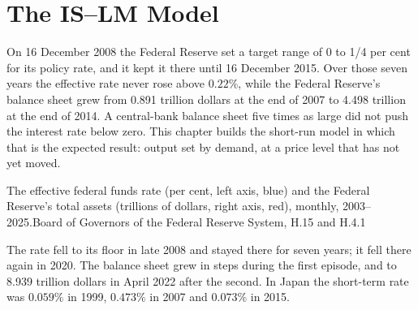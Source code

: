 \chapter{The IS--LM Model}\label{ch:b1:is-lm}

On 16 December 2008 the Federal Reserve set a target range of 0 to 1/4 per
cent for its policy rate, and it kept it there until 16 December 2015.
Over those seven years the effective rate never rose above $0.22\%$, while
the Federal Reserve's balance sheet grew from 0.891 trillion dollars at the
end of 2007 to 4.498 trillion at the end of 2014. %
A central-bank balance sheet five times as large did not push the interest rate
below zero. This chapter builds the short-run model in which that is the
expected result: output set by demand, at a price level that has not yet
moved.

\begin{openingchart}{The effective federal funds rate (per cent, left axis,
blue) and the Federal Reserve's total assets (trillions of dollars, right
axis, red), monthly, 2003--2025.}{Board of Governors of the Federal
Reserve System, H.15 and H.4.1}
\end{openingchart}

The rate fell to its floor in late 2008 and stayed there for seven years; it
fell there again in 2020. The balance sheet grew in steps during the first
episode, and to 8.939 trillion dollars in April 2022 after the second.
In Japan the short-term rate was $0.059\%$ in 1999, $0.473\%$ in 2007 and $0.073\%$
in 2015. %

